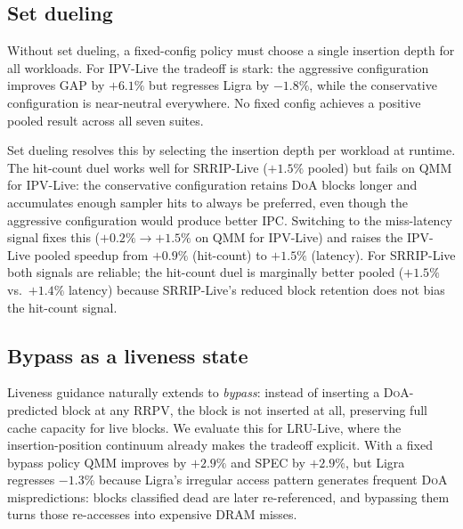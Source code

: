 \documentclass[conference]{IEEEtran}
\newcommand{\srrip}{\textsc{SRRIP}\xspace}
\newcommand{\ipv}{\textsc{IPV}\xspace}
\newcommand{\lru}{\textsc{LRU}\xspace}
\newcommand{\doa}{\textsc{DoA}\xspace}
\newcommand{\rrpv}{\textsc{RRPV}\xspace}
\begin{document}
\subsection{Set dueling}
\label{sec:setdueling}


Without set dueling, a fixed-config policy must choose a single insertion depth
for all workloads. For \ipv-Live the tradeoff is stark: the aggressive configuration
improves GAP by $+6.1\%$ but regresses Ligra by $-1.8\%$, while the conservative
configuration is near-neutral everywhere. No fixed config achieves a positive pooled
result across all seven suites.

Set dueling resolves this by selecting the insertion depth per workload at runtime.
The hit-count duel works well for \srrip-Live ($+1.5\%$ pooled) but fails on QMM
for \ipv-Live: the conservative configuration retains \doa blocks longer and
accumulates enough sampler hits to always be preferred, even though the aggressive
configuration would produce better \textsc{IPC}. Switching to the miss-latency
signal fixes this ($+0.2\% \to +1.5\%$ on QMM for \ipv-Live) and raises the
\ipv-Live pooled speedup from $+0.9\%$ (hit-count) to $+1.5\%$ (latency).
For \srrip-Live both signals are reliable; the hit-count duel is marginally better
pooled ($+1.5\%$ vs.\ $+1.4\%$ latency) because \srrip-Live's reduced block
retention does not bias the hit-count signal.

\subsection{Bypass as a liveness state}
\label{sec:bypassstate}


Liveness guidance naturally extends to \emph{bypass}: instead of inserting a
\doa-predicted block at any \rrpv, the block is not inserted at all, preserving
full cache capacity for live blocks.
We evaluate this for \lru-Live, where the insertion-position continuum already
makes the tradeoff explicit.
With a fixed bypass policy QMM improves by $+2.9\%$ and SPEC by $+2.9\%$, but Ligra
regresses $-1.3\%$ because Ligra's irregular access pattern generates frequent
\doa mispredictions: blocks classified dead are later re-referenced, and bypassing
them turns those re-accesses into expensive \textsc{DRAM} misses.
\end{document}
